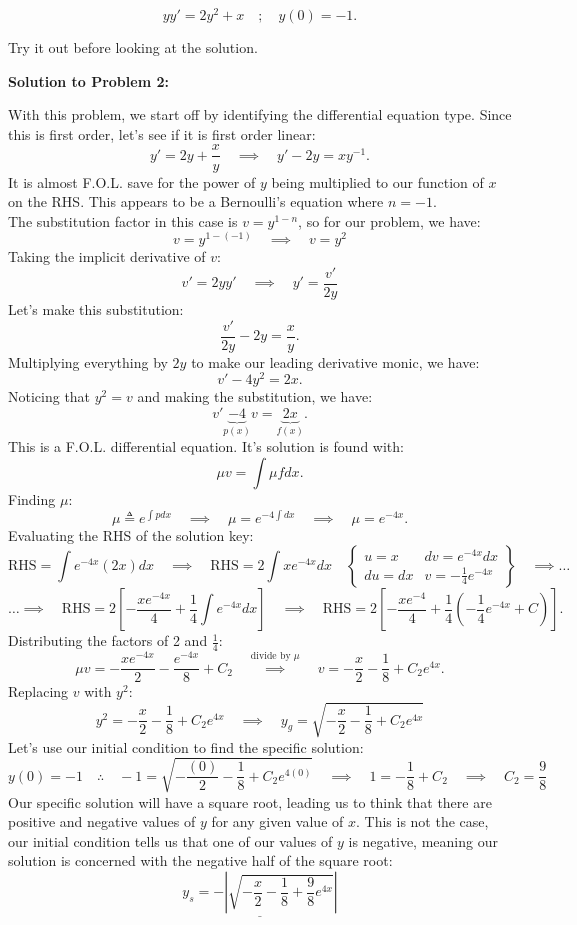 \documentclass[a4paper,12pt]{article}
\begin{document}
$$ yy' = 2y^2 + x \quad;\quad y(0  )=-1. $$

 
Try it out before looking at the solution.
\pagebreak

\textbf{Solution to Problem 2:}

With this problem, we start off by identifying the differential equation type. Since this is first order, let's see if it is first order linear:
$$ y' = 2y + \frac{x}{y} \quad\implies\quad y' - 2y = x y^{-1}.$$
It is almost F.O.L. save for the power of $y$ being multiplied to our function of $x$ on the RHS. This appears to be a Bernoulli's equation where $n=-1$.\\

The substitution factor in this case is $v=y^{1-n}$, so for our problem, we have:
$$ v=y^{1-(-1)} \quad\implies\quad \boxed{v=y^{2}} $$
Taking the implicit derivative of $v$:
$$ v' = 2yy' \quad\implies\quad \boxed{y' = \frac{v'}{2y}} $$
Let's make this substitution:
$$ \frac{v'}{2y} - 2y = \frac{x}{y}. $$
Multiplying everything by $2y$ to make our leading derivative monic, we have:
$$ v' - 4y^2 = 2x. $$
Noticing that $y^2 = v$ and making the substitution, we have:
$$ v' \underbrace{- 4}_{p(x)}v = \underbrace{2x}_{f(x)}. $$
This is a F.O.L. differential equation. It's solution is found with:
$$ \mu v = \int \mu f dx. $$
Finding $\mu$:
$$ \mu \triangleq e^{\int p dx} \quad\implies\quad \mu = e^{-4\int dx} \quad\implies\quad \mu = e^{-4x}. $$
Evaluating the RHS of the solution key:
$$ \text{RHS} = \int e^{-4x}(2x)dx \quad\implies\quad \text{RHS} = 2\int x e^{-4x}dx \quad \left\{ \begin{matrix}
	u = x & dv = e^{-4x} dx \\
	du = dx & v = -\frac{1}{4}e^{-4x}
\end{matrix}\right\} \quad\implies\ldots
$$
$$ \ldots\implies\quad \text{RHS} =  2\left[-\frac{xe^{-4x}}{4} + \frac{1}{4} \int e^{-4x}dx \right] \quad\implies\quad \text{RHS} = 2\left[-\frac{xe^{-4}}{4} + \frac{1}{4}\left(-\frac{1}{4}e^{-4x} + C\right)\right]. $$
Distributing the factors of 2 and $\frac{1}{4}$:
$$ \mu v = -\frac{xe^{-4x}}{2} - \frac{e^{-4x}}{8} + C_2 \quad\overset{\text{divide by $\mu$}}\implies\quad v = -\frac{x}{2} - \frac{1}{8} + C_2e^{4x}. $$
Replacing $v$ with $y^2$:
$$ y^2 = -\frac{x}{2} - \frac{1}{8} + C_2e^{4x} \quad\implies\quad \boxed{y_g = \sqrt{-\frac{x}{2} - \frac{1}{8} + C_2e^{4x}}} $$
Let's use our initial condition to find the specific solution:
$$ y(0)=-1 \quad\therefore\quad -1 = \sqrt{-\frac{(0)}{2} - \frac{1}{8} + C_2e^{4(0)}} \quad\implies\quad 1 = -\frac{1}{8} + C_2 \quad\implies\quad \boxed{C_2 = \frac{9}{8}} $$
Our specific solution will have a square root, leading us to think that there are positive and negative values of $y$ for any given value of $x$. This is not the case, our initial condition tells us that one of our values of $y$ is negative, meaning our solution is concerned with the negative half of the square root:
$$ \underline{\boxed{y_s = -\left|\sqrt{-\frac{x}{2} - \frac{1}{8} + \frac{9}{8}e^{4x}}\right|}} $$
\end{document}
